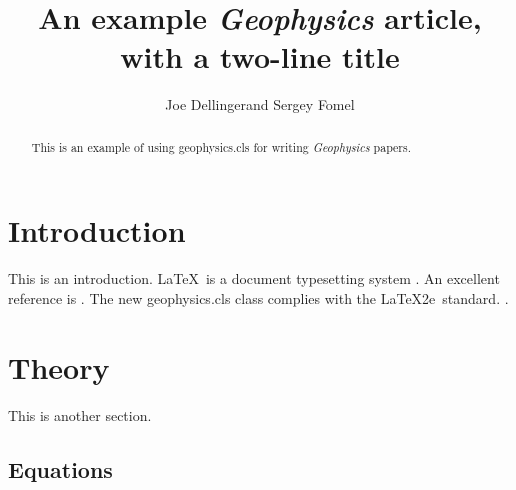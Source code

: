 \documentclass[paper,revised]{geophysics}
\begin{document}
\title{An example \emph{Geophysics} article, \\ with a two-line title}

\renewcommand{\thefootnote}{\fnsymbol{footnote}} 


\address{
\footnotemark[1]BP UTG, \\
200 Westlake Park Blvd, \\
Houston, TX, 77079 \\
\footnotemark[2]Bureau of Economic Geology, \\
John A. and Katherine G. Jackson School of Geosciences \\
The University of Texas at Austin \\
University Station, Box X \\
Austin, TX 78713-8924}
\author{Joe Dellinger\footnotemark[1] and Sergey Fomel\footnotemark[2]}


\maketitle

\begin{abstract}
  This is an example of using \textsf{geophysics.cls} for writing
  \emph{Geophysics} papers.
\end{abstract}

\section{Introduction}

This is an introduction. \LaTeX\ is a  document
typesetting system \cite{lamport}. An excellent reference is
\cite[]{kopka}. The new \textsf{geophysics.cls} class complies with
the \LaTeX2e\ standard. .

\section*{Theory}

This is another section. 

\subsection{Equations}
\end{document}
